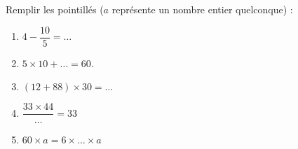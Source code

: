 
\begin{exercice}\label{exosmath-0889}

    Remplir les pointillés (\( a\) représente un nombre entier quelconque) :
    \begin{multicols}{2}
        \begin{enumerate}
            \item
                \( 4-\dfrac{ 10 }{ 5 }=\ldots\)
            \item
                \( 5\times 10+\ldots=60\).
            \item
                \( (12+88)\times 30=\ldots\)
            \item
                \( \dfrac{ 33\times 44 }{ \ldots }=33\)
            \item
                \( 60\times a=6\times \ldots\times a\)
        \end{enumerate}
    \end{multicols}

\end{exercice}
